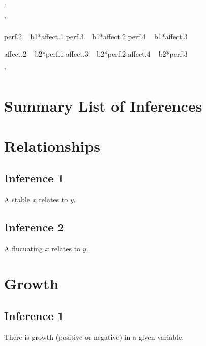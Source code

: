 \documentclass[english,,man]{apa6}
\newenvironment{Shaded}{\begin{snugshade}}{\end{snugshade}}
\newcommand{\StringTok}[1]{\textcolor[rgb]{0.31,0.60,0.02}{#1}}
\theoremstyle{definition}
\theoremstyle{definition}
\theoremstyle{definition}
\theoremstyle{remark}
\begin{document}
.

\begin{Shaded}
\begin{Highlighting}[]
\StringTok{'}

\StringTok{perf.2 ~ b1*affect.1}
\StringTok{perf.3 ~ b1*affect.2}
\StringTok{perf.4 ~ b1*affect.3}

\StringTok{affect.2 ~ b2*perf.1}
\StringTok{affect.3 ~ b2*perf.2}
\StringTok{affect.4 ~ b2*perf.3}

\StringTok{'}
\end{Highlighting}
\end{Shaded}

\hypertarget{summary-list-of-inferences}{%
\section{Summary List of Inferences}\label{summary-list-of-inferences}}

\hypertarget{relationships-1}{%
\section{Relationships}\label{relationships-1}}

\hypertarget{inference-1-5}{%
\subsection{Inference 1}\label{inference-1-5}}

A stable \(x\) relates to \(y\).

\hypertarget{inference-2-3}{%
\subsection{Inference 2}\label{inference-2-3}}

A flucuating \(x\) relates to \(y\).

\hypertarget{growth-1}{%
\section{Growth}\label{growth-1}}

\hypertarget{inference-1-6}{%
\subsection{Inference 1}\label{inference-1-6}}

There is growth (positive or negative) in a given variable.
\end{document}
